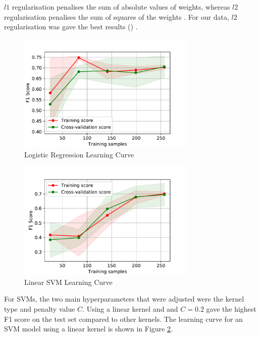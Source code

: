 $l1$ regularisation penalises the sum of absolute values of weights, whereas $l2$ regularisation penalises the sum of squares of the weights \cite{ahmadian1998regularisation}. For our data, $l2$ regularisation was gave the best results () .

\begin{figure}[ht]
\includegraphics[width=8.5cm]{plots/LR TVT LC F1.pdf}
\caption{Logistic Regression Learning Curve}
\label{fig:lrlc}
\centering
\end{figure}

\begin{figure}[ht]
\includegraphics[width=8.5cm]{plots/SVM TVT LC F1.pdf}
\caption{Linear SVM Learning Curve }
\vspace{-0.5em}
\label{svmlc}
\centering
\end{figure}

For SVMs, the two main hyperparameters that were adjusted were the kernel type and penalty value $C$. Using a linear kernel and and $C=0.2$ gave the highest F1 score on the test set compared to other kernels. The learning curve for an SVM model using a linear kernel is shown in Figure \ref{svmlc}.

